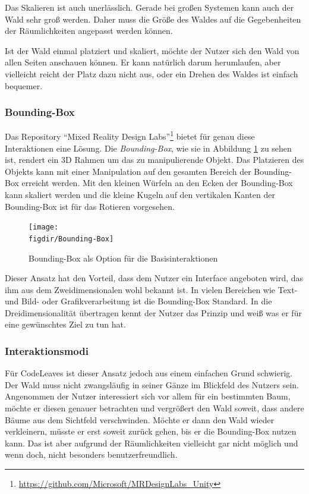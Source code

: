 Das Skalieren ist auch unerlässlich. Gerade bei großen Systemen kann auch der Wald sehr groß werden. Daher muss die Größe des Waldes auf die Gegebenheiten der Räumlichkeiten angepasst werden können.

Ist der Wald einmal platziert und skaliert, möchte der Nutzer sich den Wald von allen Seiten anschauen können. Er kann natürlich darum herumlaufen, aber vielleicht reicht der Platz dazu nicht aus, oder ein Drehen des Waldes ist einfach bequemer.

\subsubsection*{Bounding-Box}

Das Repository "`Mixed Reality Design Labs"'\footnote{\url{https://github.com/Microsoft/MRDesignLabs_Unity}} bietet für genau diese Interaktionen eine Lösung. Die \textit{Bounding-Box}, wie sie in Abbildung \ref{fig:Bounding-Box} zu sehen ist, rendert ein 3D Rahmen um das zu manipulierende Objekt. Das Platzieren des Objekts kann mit einer Manipulation auf den gesamten Bereich der Bounding-Box erreicht werden. Mit den kleinen Würfeln an den Ecken der Bounding-Box kann skaliert werden und die kleine Kugeln auf den vertikalen Kanten der Bounding-Box ist für das Rotieren vorgesehen.

\begin{figure}[htb]
  \texttt{[image: \\figdir/Bounding-Box]}
  \caption{Bounding-Box als Option für die Basisinteraktionen \cite{microsoft2017mixed}}
  \label{fig:Bounding-Box}
\end{figure}

Dieser Ansatz hat den Vorteil, dass dem Nutzer ein Interface angeboten wird, das ihm aus dem Zweidimensionalen wohl bekannt ist. In vielen Bereichen wie Text- und Bild- oder Grafikverarbeitung ist die Bounding-Box Standard. In die Dreidimensionalität übertragen kennt der Nutzer das Prinzip und weiß was er für eine gewünschtes Ziel zu tun hat.

\subsubsection*{Interaktionsmodi}

Für CodeLeaves ist dieser Ansatz jedoch aus einem einfachen Grund schwierig. Der Wald muss nicht zwangsläufig in seiner Gänze im Blickfeld des Nutzers sein. Angenommen der Nutzer interessiert sich vor allem für ein bestimmten Baum, möchte er diesen genauer betrachten und vergrößert den Wald soweit, dass andere Bäume aus dem Sichtfeld verschwinden. Möchte er dann den Wald wieder verkleinern, müsste er erst soweit zurück gehen, bis er die Bounding-Box nutzen kann. Das ist aber aufgrund der Räumlichkeiten vielleicht gar nicht möglich und wenn doch, nicht besonders benutzerfreundlich.

